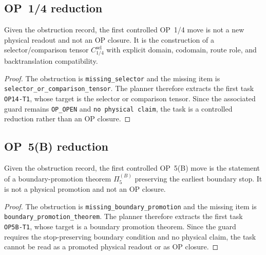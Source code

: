 \subsection{OP~1/4 reduction}
\label{subsec:v410r03-op14-reduction}

\begin{proposition}
\label{prop:v410r03-op14-selector-task-reduction}
Given the obstruction record, the first controlled OP~1/4 move is not a
new physical readout and not an OP closure. It is the construction of a
selector/comparison tensor \(C_{1/4}^{\mathrm{sel}}\) with explicit domain,
codomain, route role, and backtranslation compatibility.
\end{proposition}

\begin{proof}
The obstruction is \texttt{missing\_selector} and the missing item is
\texttt{selector\_or\_comparison\_tensor}. The planner therefore
extracts the first task \texttt{OP14-T1}, whose target is the selector or
comparison tensor. Since the associated guard remains \texttt{OP\_OPEN} and
\texttt{no physical claim}, the task is a controlled reduction rather than an
OP closure.
\end{proof}

\subsection{OP~5(B) reduction}
\label{subsec:v410r03-op5b-reduction}

\begin{proposition}
\label{prop:v410r03-op5b-boundary-promotion-task-reduction}
Given the obstruction record, the first controlled OP~5(B) move is the
statement of a boundary-promotion theorem \(\Pi_{5}^{(B)}\) preserving the earliest
boundary stop. It is not a physical promotion and not an OP closure.
\end{proposition}

\begin{proof}
The obstruction is \texttt{missing\_boundary\_promotion} and the missing
item is \texttt{boundary\_promotion\_theorem}. The planner therefore
extracts the first task \texttt{OP5B-T1}, whose target is a boundary
promotion theorem. Since the guard requires the stop-preserving boundary
condition and no physical claim, the task cannot be read as a promoted physical
readout or as OP closure.
\end{proof}

